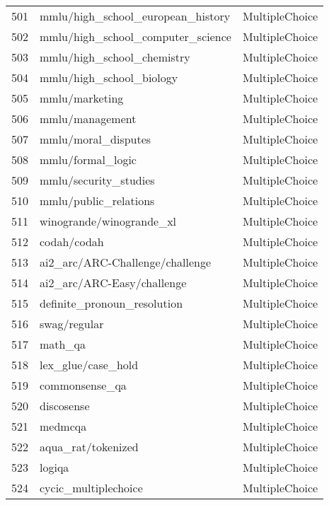\documentclass[11pt]{article}
\begin{document}
\begin{longtable}{lll}
501 & mmlu/high\_school\_european\_history \citep{hendryckstest2021} & MultipleChoice \\
502 & mmlu/high\_school\_computer\_science \citep{hendryckstest2021} & MultipleChoice \\
503 & mmlu/high\_school\_chemistry \citep{hendryckstest2021} & MultipleChoice \\
504 & mmlu/high\_school\_biology \citep{hendryckstest2021} & MultipleChoice \\
505 & mmlu/marketing \citep{hendryckstest2021} & MultipleChoice \\
506 & mmlu/management \citep{hendryckstest2021} & MultipleChoice \\
507 & mmlu/moral\_disputes \citep{hendryckstest2021} & MultipleChoice \\
508 & mmlu/formal\_logic \citep{hendryckstest2021} & MultipleChoice \\
509 & mmlu/security\_studies \citep{hendryckstest2021} & MultipleChoice \\
510 & mmlu/public\_relations \citep{hendryckstest2021} & MultipleChoice \\
511 & winogrande/winogrande\_xl \citep{ai2:winogrande} & MultipleChoice \\
512 & codah/codah \citep{chen2019codah} & MultipleChoice \\
513 & ai2\_arc/ARC-Challenge/challenge \citep{allenai:arc} & MultipleChoice \\
514 & ai2\_arc/ARC-Easy/challenge \citep{allenai:arc} & MultipleChoice \\
515 & definite\_pronoun\_resolution \citep{rahman2012resolving} & MultipleChoice \\
516 & swag/regular \citep{zellers2018swagaf} & MultipleChoice \\
517 & math\_qa & MultipleChoice \\
518 & lex\_glue/case\_hold \citep{Zheng2021} & MultipleChoice \\
519 & commonsense\_qa \citep{talmor-etal-2019-commonsenseqa} & MultipleChoice \\
520 & discosense & MultipleChoice \\
521 & medmcqa \citep{pmlr-v174-pal22a} & MultipleChoice \\
522 & aqua\_rat/tokenized \citep{ACL} & MultipleChoice \\
523 & logiqa \citep{liu2020logiqa} & MultipleChoice \\
524 & cycic\_multiplechoice \citep{Kejriwal2020DoFC} & MultipleChoice \\

\end{longtable}
\end{document}
